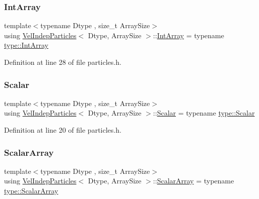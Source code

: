 \subsubsection{\texorpdfstring{Int\+Array}{IntArray}}
{\footnotesize\ttfamily template$<$typename Dtype , size\+\_\+t Array\+Size$>$ \\
using \mbox{\hyperlink{class_vel_indep_particles}{Vel\+Indep\+Particles}}$<$ Dtype, Array\+Size $>$\+::\mbox{\hyperlink{class_vel_indep_particles_a5e4f20d435c71a5f4179143206258a81}{Int\+Array}} =  typename \mbox{\hyperlink{struct_space_h_1_1_proto_type_ad9105b93d029a9d231bc31ddcfd7dbd9}{type\+::\+Int\+Array}}}



Definition at line 28 of file particles.\+h.

\mbox{\label{class_vel_indep_particles_a5d275b22f0d759f360ddd80e78f4b466}} 
\subsubsection{\texorpdfstring{Scalar}{Scalar}}
{\footnotesize\ttfamily template$<$typename Dtype , size\+\_\+t Array\+Size$>$ \\
using \mbox{\hyperlink{class_vel_indep_particles}{Vel\+Indep\+Particles}}$<$ Dtype, Array\+Size $>$\+::\mbox{\hyperlink{class_vel_indep_particles_a5d275b22f0d759f360ddd80e78f4b466}{Scalar}} =  typename \mbox{\hyperlink{struct_space_h_1_1_proto_type_af3c8245d83d9db64749882920de5c274}{type\+::\+Scalar}}}



Definition at line 20 of file particles.\+h.

\mbox{\label{class_vel_indep_particles_abd6e6b0ffbbab4ebc078efd77f6a365a}} 
\subsubsection{\texorpdfstring{Scalar\+Array}{ScalarArray}}
{\footnotesize\ttfamily template$<$typename Dtype , size\+\_\+t Array\+Size$>$ \\
using \mbox{\hyperlink{class_vel_indep_particles}{Vel\+Indep\+Particles}}$<$ Dtype, Array\+Size $>$\+::\mbox{\hyperlink{class_vel_indep_particles_abd6e6b0ffbbab4ebc078efd77f6a365a}{Scalar\+Array}} =  typename \mbox{\hyperlink{struct_space_h_1_1_proto_type_a09ef91dc8a37a044c403f5a833044725}{type\+::\+Scalar\+Array}}}



